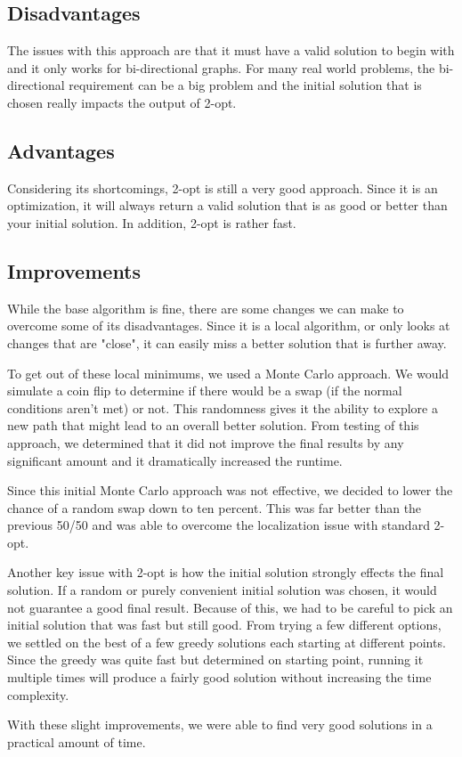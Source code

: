 \documentclass[12pt]{report}
\begin{document}
\begin{multicols}{2}
    \subsection{Disadvantages}
    The issues with this approach are that it must have a valid solution to begin with and it only works for bi-directional graphs. For many real world problems, the bi-directional requirement can be a big problem and the initial solution that is chosen really impacts the output of 2-opt.
    \subsection{Advantages}
    Considering its shortcomings, 2-opt is still a very good approach. Since it is an optimization, it will always return a valid solution that is as good or better than your initial solution. In addition, 2-opt is rather fast.
    \subsection{Improvements}
    While the base algorithm is fine, there are some changes we can make to overcome some of its disadvantages. Since it is a local algorithm, or only looks at changes that are "close", it can easily miss a better solution that is further away.

    To get out of these local minimums, we used a Monte Carlo approach. We would simulate a coin flip to determine if there would be a swap (if the normal conditions aren't met) or not. This randomness gives it the ability to explore a new path that might lead to an overall better solution. From testing of this approach, we determined that it did not improve the final results by any significant amount and it dramatically increased the runtime.

    Since this initial Monte Carlo approach was not effective, we decided to lower the chance of a random swap down to ten percent. This was far better than the previous 50/50 and was able to overcome the localization issue with standard 2-opt.

    Another key issue with 2-opt is how the initial solution strongly effects the final solution. If a random or purely convenient initial solution was chosen, it would not guarantee a good final result. Because of this, we had to be careful to pick an initial solution that was fast but still good. From trying a few different options, we settled on the best of a few greedy solutions each starting at different points. Since the greedy was quite fast but determined on starting point, running it multiple times will produce a fairly good solution without increasing the time complexity.

    With these slight improvements, we were able to find very good solutions in a practical amount of time.
\end{multicols}
\end{document}
